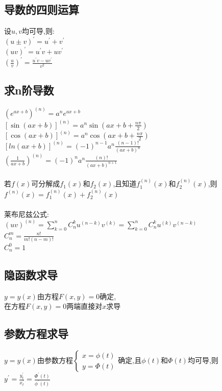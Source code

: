 \documentclass{article}
\begin{document}
\begin{flushleft}
	\subsection{导数的四则运算}
	
	设$u,v$均可导,则:\\
	$(u\pm v)^{'}=u^{'}+v^{'}$\\
	$(uv)^{'}=u^{'}v+uv^{'}$\\
	$(\frac{u}{v})^{'}=\frac{u^{'}v-uv^{'}}{v^2}$\\
	
	\subsection{求n阶导数}
	
	$(e^{ax+b})^{(n)}=a^ne^{ax+b}$\\
	$[\sin(ax+b)]^{(n)}=a^n\sin(ax+b+\frac{n\pi}{2})$\\
	$[\cos(ax+b)]^{(n)}=a^n\cos(ax+b+\frac{n\pi}{2})$\\
	$[ln(ax+b)]^{(n)}=(-1)^{n-1}a^n\frac{(n-1)!}{(ax+b)^n}$\\
	$(\frac{1}{ax+b})^{(n)}=(-1)^{n}a^n\frac{(n)!}{(ax+b)^{n+1}}$\\
	~\\
	若$f(x)$可分解成$f_1(x)$和$f_2(x)$,且知道$f_1^{(n)}(x)$和$f_2^{(n)}(x)$,则$f^{(n)}(x)=f_1^{(n)}(x)+f_2^{(n)}(x)$\\
	~\\
	莱布尼兹公式:\\
	$(uv)^{(n)} = \sum\limits_{k=0}^{n} C_n^k u^{(n-k)} v^{(k)} = \sum\limits_{k=0}^{n} C_n^k u^{(k)} v^{(n-k)}$\\
	$C_n^m=\frac{n!}{m!(n-m)!}$\\
	$C_n^0=1$\\
	
	\subsection{隐函数求导}
	
	$y=y(x)$由方程$F(x,y)=0$确定,\\
	在方程$F(x,y)=0$两端直接对$x$求导\\
	
	\subsection{参数方程求导}
	
	$y=y(x)$由参数方程$\left\{
	\begin{array}{rcl}
	x=\phi(t)\\
	y=\Phi(t)
	\end{array} \right.$确定,且$\phi(t)$和$\Phi(t)$均可导,则$y^{'}=\frac{y^{'}_t}{x^{'}_t}=\frac{\Phi^{'}(t)}{\phi^{'}(t)}$\\
	

\end{flushleft}
\end{document}
